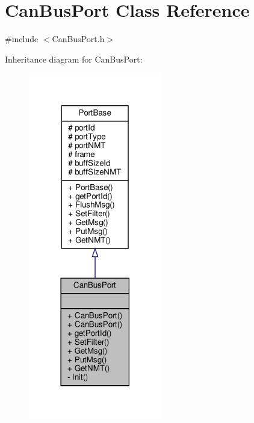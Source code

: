 \hypertarget{classCanBusPort}{}\section{Can\+Bus\+Port Class Reference}
\label{classCanBusPort}


{\ttfamily \#include $<$Can\+Bus\+Port.\+h$>$}



Inheritance diagram for Can\+Bus\+Port\+:
\nopagebreak
\begin{figure}[H]
\begin{center}
\leavevmode
\includegraphics[width=165pt]{classCanBusPort__inherit__graph}
\end{center}
\end{figure}


